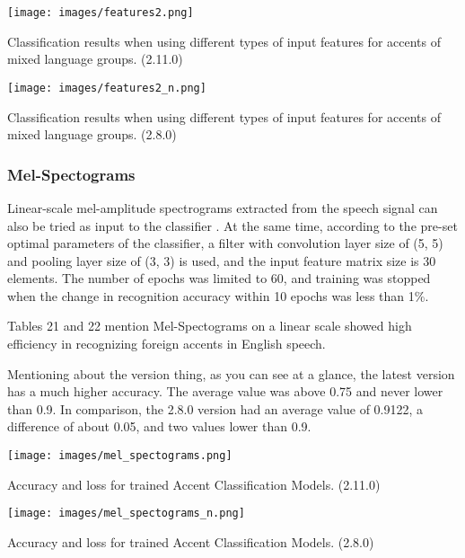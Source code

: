 \documentclass[ams]{U-AizuGT}
\begin{document}
\begin{table}[h]
    \centering
    \texttt{[image: images/features2.png]}
    \caption{ Classification results when using different types of input features for accents of mixed language groups. (2.11.0)}
\end{table}
\begin{table}[h]
    \centering
    \texttt{[image: images/features2\_n.png]}
    \caption{ Classification results when using different types of input features for accents of mixed language groups. (2.8.0)}
\end{table}
\clearpage
\subsubsection{Mel-Spectograms}
Linear-scale mel-amplitude spectrograms extracted from the speech signal can also be tried as input to the classifier \cite{Veranika:lang}. At the same time, according to the pre-set optimal parameters of the classifier, a filter with convolution layer size of (5, 5) and pooling layer size of (3, 3) is used, and the input feature matrix size is 30 elements. The number of epochs was limited to 60, and training was stopped when the change in recognition accuracy within 10 epochs was less than 1\%.\par
Tables 21 and 22 mention Mel-Spectograms on a linear scale showed high efficiency in recognizing foreign accents in English speech. \par
Mentioning about the version thing, as you can see at a glance, the latest version has a much higher accuracy. The average value was above 0.75 and never lower than 0.9. In comparison, the 2.8.0 version had an average value of 0.9122, a difference of about 0.05, and two values lower than 0.9.
\begin{table}[h]
    \centering
    \texttt{[image: images/mel\_spectograms.png]}
    \caption{Accuracy and loss for trained Accent Classification Models. (2.11.0)}
\end{table}
\begin{table}[h]
    \centering
    \texttt{[image: images/mel\_spectograms\_n.png]}
    \caption{Accuracy and loss for trained Accent Classification Models. (2.8.0)}
\end{table}
\end{document}
